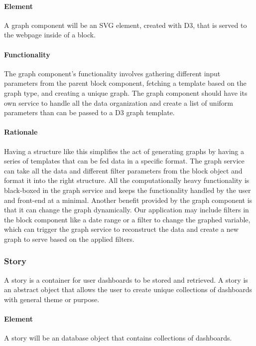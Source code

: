         \paragraph{Element}
            A graph component will be an SVG element, created with D3, that is served to the webpage inside of a block. 
        \paragraph{Functionality}
            The graph component's functionality involves gathering different input parameters from the parent block component, fetching a template based on the graph type, and creating a unique graph. 
            The graph component should have its own service to handle all the data organization and create a list of uniform parameters than can be passed to a D3 graph template.
        \paragraph{Rationale}
            Having a structure like this simplifies the act of generating graphs by having a series of templates that can be fed data in a specific format. 
            The graph service can take all the data and different filter parameters from the block object and format it into the right structure. 
            All the computationally heavy functionality is black-boxed in the graph service and keeps the functionality handled by the user and front-end at a minimal. 
            Another benefit provided by the graph component is that it can change the graph dynamically. 
            Our application may include filters in the block component like a date range or a filter to change the graphed variable, which can trigger the graph service to reconstruct the data and create a new graph to serve based on the applied filters.
    
        \subsubsection{Story}
        A story is a container for user dashboards to be stored and retrieved. A story is an abstract object that allows the user to create unique collections of dashboards with general theme or purpose.
        \paragraph{Element}
            A story will be an database object that contains collections of dashboards.
